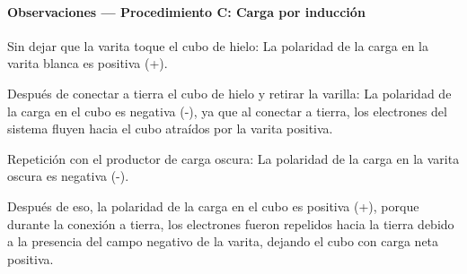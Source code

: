 \documentclass[12pt,a4paper]{article}
\begin{document}
\paragraph{Observaciones --- Procedimiento C: Carga por inducción} 

Sin dejar que la varita toque el cubo de hielo: La polaridad de la carga en la varita blanca es positiva (+).

Después de conectar a tierra el cubo de hielo y retirar la varilla: La polaridad de la carga en el cubo es negativa (-), ya que al conectar a tierra, los electrones del sistema fluyen hacia el cubo atraídos por la varita positiva.

Repetición con el productor de carga oscura: La polaridad de la carga en la varita oscura es negativa (-).

Después de eso, la polaridad de la carga en el cubo es positiva (+), porque durante la conexión a tierra, los electrones fueron repelidos hacia la tierra debido a la presencia del campo negativo de la varita, dejando el cubo con carga neta positiva.
\end{document}
